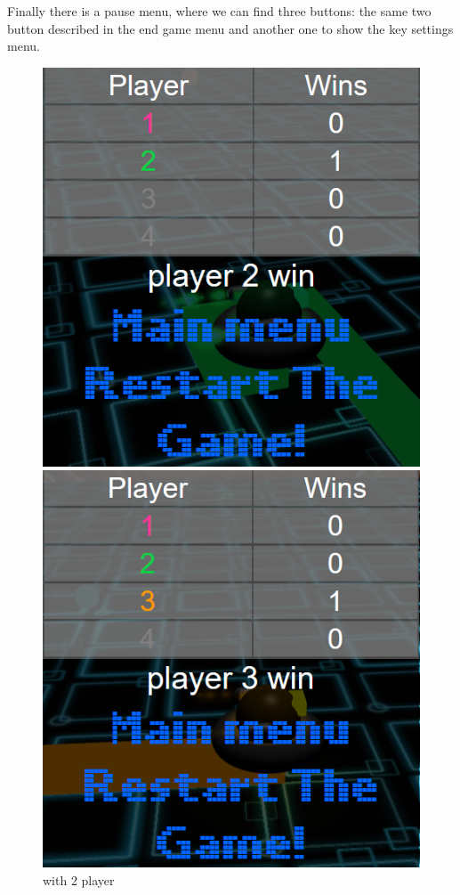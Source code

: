 \documentclass[11pt]{article}
\begin{document}
	Finally there is a pause menu, where we can find three buttons: the same two button described in the end game menu and another one to show the key settings menu.\\
	 
\begin{figure}
	\centering
	\begin{minipage}[b]{0.3005\linewidth}
		\includegraphics[width=\linewidth]{endGameMenu2}
		\caption{with 2 player}
		\label{fig:endGameMenu2}
	\end{minipage}
	\begin{minipage}[b]{0.3015\linewidth}
		\includegraphics[width=\linewidth]{endGameMenu3}

\end{minipage}
\end{figure}
\end{document}
